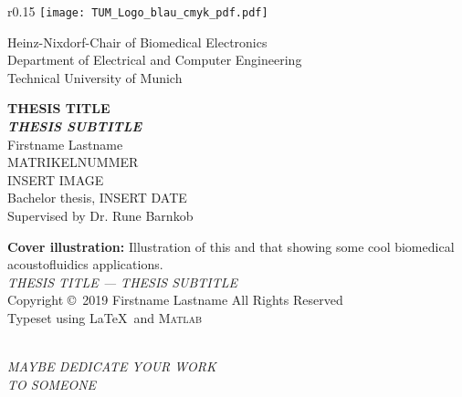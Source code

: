 \thispagestyle{empty}
\frontmatter
{}

\begin{wrapfigure}{r}{0.15\textwidth}
	\texttt{[image: TUM\_Logo\_blau\_cmyk\_pdf.pdf]}
\end{wrapfigure}
\noindent
\small{\textcolor{tum}{Heinz-Nixdorf-Chair of Biomedical Electronics\\
Department of Electrical and Computer Engineering\\
Technical University of Munich\\} }

\begin{center}

\vspace*{20mm}
\Huge{\bf\sf THESIS TITLE}\\[3mm]
\LARGE{\bf\sf\textit{THESIS SUBTITLE}}
\\[15mm]
{\LARGE Firstname Lastname}
\\[5mm]
{\normalsize MATRIKELNUMMER}
\\[11mm]
INSERT IMAGE
\vspace{\fill}
\\[10mm]
{\large Bachelor thesis, INSERT DATE
\\[3mm]
Supervised by Dr. Rune Barnkob}

\end{center}

\newpage
%
\thispagestyle{empty}
\vspace*{1cm}
{\noindent \textbf{Cover illustration:} Illustration of this and that showing some cool biomedical acoustofluidics applications.}\\[1cm]
{\noindent \textit{THESIS TITLE --- THESIS SUBTITLE}}\\[0.5cm]
{\noindent Copyright \copyright\ 2019 Firstname Lastname All Rights Reserved}\\
{\noindent Typeset using \LaTeX\ and \textsc{Matlab}}\\\\
\vspace*{9cm}
\begin{center}
\large{\textit{MAYBE DEDICATE YOUR WORK}}\\
\large{\textit{TO SOMEONE}}
\end{center}
